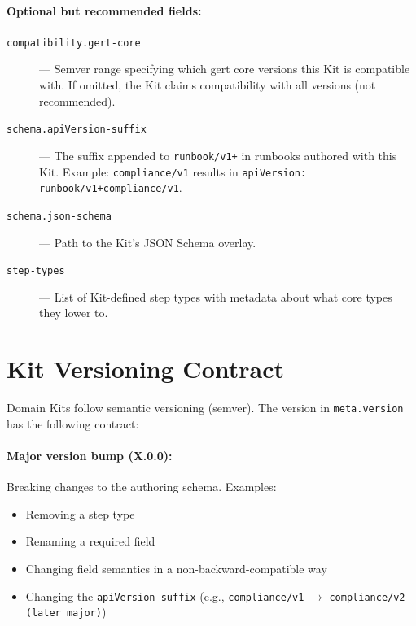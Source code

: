 \paragraph{Optional but recommended fields:}

\begin{description}
  \item[\texttt{compatibility.gert-core}] --- Semver range specifying which
    gert core versions this Kit is compatible with. If omitted, the Kit claims
    compatibility with all versions (not recommended).
  \item[\texttt{schema.apiVersion-suffix}] --- The suffix appended to
    \texttt{runbook/v1+} in runbooks authored with this Kit. Example:
    \texttt{compliance/v1} results in \texttt{apiVersion: runbook/v1+compliance/v1}.
  \item[\texttt{schema.json-schema}] --- Path to the Kit's JSON Schema overlay.
  \item[\texttt{step-types}] --- List of Kit-defined step types with metadata
    about what core types they lower to.
\end{description}

\section{Kit Versioning Contract}
\label{sec:kit-versioning}

Domain Kits follow semantic versioning (semver). The version in
\texttt{meta.version} has the following contract:

\paragraph{Major version bump (X.0.0):}
Breaking changes to the authoring schema. Examples:

\begin{itemize}
  \item Removing a step type
  \item Renaming a required field
  \item Changing field semantics in a non-backward-compatible way
  \item Changing the \texttt{apiVersion-suffix} (e.g., \texttt{compliance/v1}
    $\to$ \texttt{compliance/v2 (later major)})
\end{itemize}

